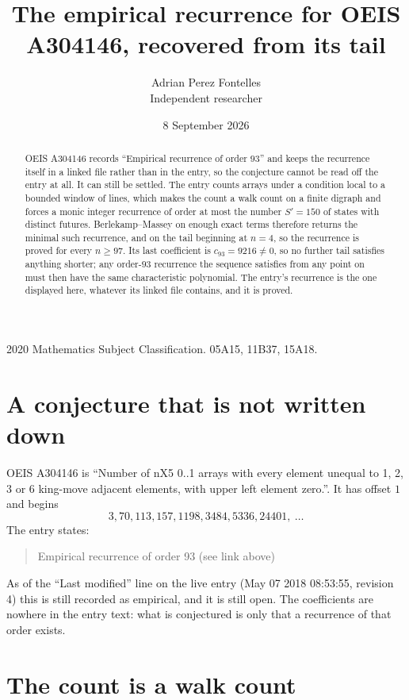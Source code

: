 \documentclass[11pt,a4paper]{article}
\title{The empirical recurrence for OEIS A304146, recovered from its tail}
\author{Adrian Perez Fontelles\\ \small Independent researcher}
\date{8 September 2026}
\theoremstyle{plain}
\theoremstyle{definition}
\begin{document}
\maketitle

\begin{abstract}
OEIS A304146 records ``Empirical recurrence of order $93$'' and keeps the recurrence itself in
a linked file rather than in the entry, so the conjecture cannot be read off the entry at all.
It can still be settled. The entry counts arrays under a condition local to a bounded window of
lines, which makes the count a walk count on a finite digraph and forces a monic integer
recurrence of order at most the number $S'=150$ of states with distinct futures. Berlekamp--Massey on
enough exact terms therefore returns the minimal such recurrence, and on the tail beginning at $n=4$, so the recurrence is proved for every $n\ge97$.
Its last coefficient is $c_{93}=9216\neq0$, so no further tail satisfies anything
shorter; any order-$93$ recurrence the sequence satisfies from any point on must then have
the same characteristic polynomial. The entry's recurrence is the one displayed here, whatever
its linked file contains, and it is proved.
\end{abstract}

\noindent\small 2020 Mathematics Subject Classification. 05A15, 11B37, 15A18.\normalsize

\section{A conjecture that is not written down}

OEIS A304146 is ``Number of nX5 0..1 arrays with every element unequal to 1, 2, 3 or 6 king-move adjacent elements, with upper left element zero.''. It has offset $1$ and begins
\[
3, 70, 113, 157, 1198, 3484, 5336, 24401,\ \dots
\]
The entry states:
\begin{quote}
Empirical recurrence of order 93 (see link above)
\end{quote}
As of the ``Last modified'' line on the live entry (May 07 2018 08:53:55, revision 4)
this is still recorded as empirical, and it is still open. The coefficients are nowhere in the
entry text: what is conjectured is only that a recurrence of that order exists.

\section{The count is a walk count}
\end{document}
